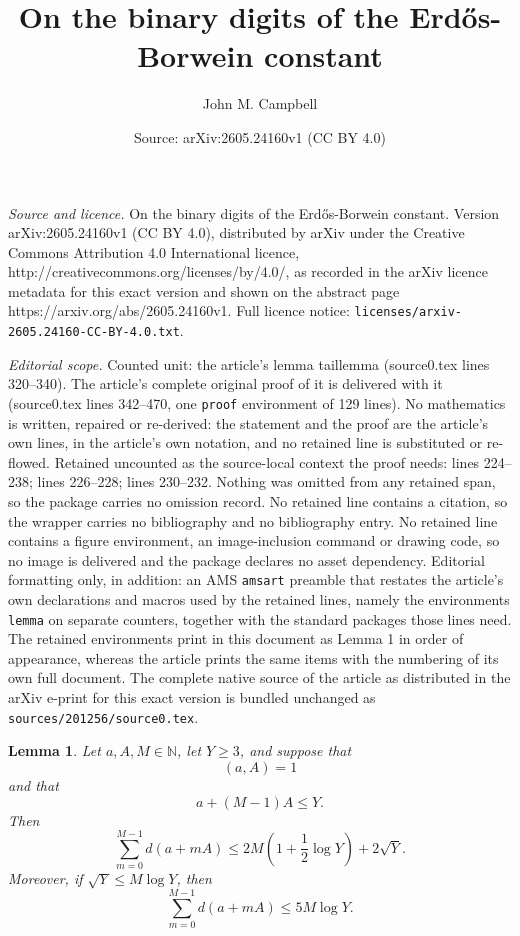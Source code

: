 \documentclass[10pt,a4paper]{amsart}
\title{On the binary digits of the Erd\H{o}s-Borwein constant}
\author{John M. Campbell}
\date{Source: arXiv:2605.24160v1 (CC BY 4.0)}
\newtheorem{lemma}{Lemma}
\begin{document}
\maketitle

\noindent\emph{Source and licence.} On the binary digits of the Erd\H{o}s-Borwein constant. Version arXiv:2605.24160v1 (CC BY 4.0), distributed by arXiv under the Creative Commons Attribution 4.0 International licence, http://creativecommons.org/licenses/by/4.0/, as recorded in the arXiv licence metadata for this exact version and shown on the abstract page https://arxiv.org/abs/2605.24160v1. Full licence notice: \texttt{licenses/arxiv-2605.24160-CC-BY-4.0.txt}.\par\smallskip

\noindent\textit{Editorial scope.} Counted unit: the article's lemma taillemma (source0.tex lines 320--340). The article's complete original proof of it is delivered with it (source0.tex lines 342--470, one \texttt{proof} environment of 129 lines). No mathematics is written, repaired or re-derived: the statement and the proof are the article's own lines, in the article's own notation, and no retained line is substituted or re-flowed.  Retained uncounted as the source-local context the proof needs: lines 224--238; lines 226--228; lines 230--232.  Nothing was omitted from any retained span, so the package carries no omission record.  No retained line contains a citation, so the wrapper carries no bibliography and no bibliography entry.  No retained line contains a figure environment, an image-inclusion command or drawing code, so no image is delivered and the package declares no asset dependency.  Editorial formatting only, in addition: an AMS \texttt{amsart} preamble that restates the article's own declarations and macros used by the retained lines, namely the environments \texttt{lemma} on separate counters, together with the standard packages those lines need.  The retained environments print in this document as Lemma 1 in order of appearance, whereas the article prints the same items with the numbering of its own full document.  The complete native source of the article as distributed in the arXiv e-print for this exact version is bundled unchanged as \texttt{sources/201256/source0.tex}.
\begin{lemma}\label{basiclogbound}
 Let $a, A, M \in \mathbb{N}$, let $Y \geq 3$, and suppose that 
\begin{equation}\label{aA1} 
 (a, A) = 1 
\end{equation}
 and that 
\begin{equation}\label{aM1Ay} 
 a + (M - 1) A \leq Y. 
\end{equation}
 Then $$ \sum_{m=0}^{M-1} d(a + m A) \leq 2 M \left( 1 + \frac{1}{2} \log Y \right) + 2 \sqrt{Y}. $$ Moreover, if $ \sqrt{Y} \leq M \log 
 Y$, then 
\begin{equation}\label{withsqrtMlog}
 \sum_{m=0}^{M-1} d(a + m A) \leq 5 M \log Y. 
\end{equation}
\end{lemma}
\end{document}
